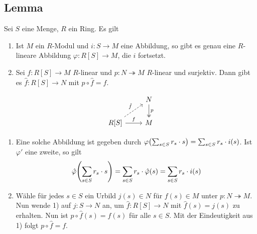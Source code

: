 \subsection[Lemma: Universale Eigenschaft von freien Moduln]{Lemma} %
\label{sub:32}
Sei $S$ eine Menge, $R$ ein Ring. Es gilt\\
\begin{minipage}{0.7\textwidth}
	\begin{enumerate}[1)]
		\item Ist $M$ ein $R$-Modul und $i \colon S \to M$ eine Abbildung, so gibt es genau eine $R$-lineare Abbildung $\varphi \colon R[S] \to M$, die $i$ fortsetzt.
		\item Sei $f\colon R[S]\to M$ $R$-linear und $p\colon N\twoheadrightarrow M$ $R$-linear und surjektiv. Dann gibt es $\hat{f}\colon R[S]\to N$ mit $p\circ \hat{f} =f$.
	\end{enumerate}
\end{minipage}\hfill
\begin{minipage}{0.25\textwidth}
	\[
		\begin{tikzcd}
			\mbox{ } & N \dar["p", two heads] \\
			R[S] \rar["f"] \urar["\hat{f}", dashed] & M
		\end{tikzcd}
	\]
\end{minipage}
\begin{enumerate}[1)]
	\item Eine solche Abbildung ist gegeben durch
	\(
		\varphi \enbrace*{\sum_{s \in S} r_s \cdot s} = \sum_{s \in S} r_s \cdot i(s)
	\).
	Ist $\varphi'$ eine zweite, so gilt 
	\begin{align*}
		\hat{\varphi} \enbrace*{\sum_{s \in S} r_s \cdot s}  = \sum_{s \in S} r_s \cdot \hat{\varphi}(s) = \sum_{s  \in S} r_s \cdot i(s)
	\end{align*}
	\item Wähle für jedes $s \in S$ ein Urbild $j(s)\in N$ für $f(s) \in M$ unter $p : N \twoheadrightarrow M$. Nun wende 1) auf $j : S \to N$ an, um $\hat{f} : R[S] \to N$
	mit $\hat{f}(s) = j(s)$ zu erhalten. Nun ist $ p \circ \hat{f}(s) = f(s)$ für alle $s \in S$. Mit der Eindeutigkeit aus 1) folgt $p \circ \hat{f} = f$. \bewende
\end{enumerate}

